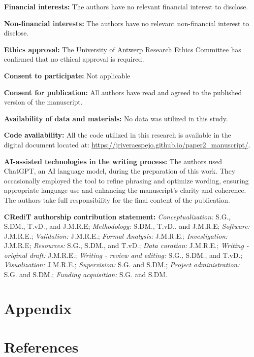 \documentclass[
  authoryear,
  preprint,
  1p]{elsarticle}
\begin{document}
\textbf{Financial interests:} The authors have no relevant financial
interest to disclose.

\textbf{Non-financial interests:} The authors have no relevant
non-financial interest to disclose.

\textbf{Ethics approval:} The University of Antwerp Research Ethics
Committee has confirmed that no ethical approval is required.

\textbf{Consent to participate:} Not applicable

\textbf{Consent for publication:} All authors have read and agreed to
the published version of the manuscript.

\textbf{Availability of data and materials:} No data was utilized in
this study.

\textbf{Code availability:} All the code utilized in this research is
available in the digital document located at:
\url{https://jriveraespejo.github.io/paper2_manuscript/}.

\textbf{AI-assisted technologies in the writing process:} The authors
used ChatGPT, an AI language model, during the preparation of this work.
They occasionally employed the tool to refine phrasing and optimize
wording, ensuring appropriate language use and enhancing the
manuscript's clarity and coherence. The authors take full responsibility
for the final content of the publication.

\textbf{CRediT authorship contribution statement:}
\emph{Conceptualization:} S.G., S.DM., T.vD., and J.M.R.E;
\emph{Methodology:} S.DM., T.vD., and J.M.R.E; \emph{Software:}
J.M.R.E.; \emph{Validation:} J.M.R.E.; \emph{Formal Analysis:} J.M.R.E.;
\emph{Investigation:} J.M.R.E; \emph{Resources:} S.G., S.DM., and T.vD.;
\emph{Data curation:} J.M.R.E.; \emph{Writing - original draft:}
J.M.R.E.; \emph{Writing - review and editing:} S.G., S.DM., and T.vD.;
\emph{Visualization:} J.M.R.E.; \emph{Supervision:} S.G. and S.DM.;
\emph{Project administration:} S.G. and S.DM.; \emph{Funding
acquisition:} S.G. and S.DM.

\newpage{}

\section{Appendix}\label{sec-appendix}

\newpage{}

\section*{References}\label{references}

\renewcommand{\bibsection}{}

\end{document}
